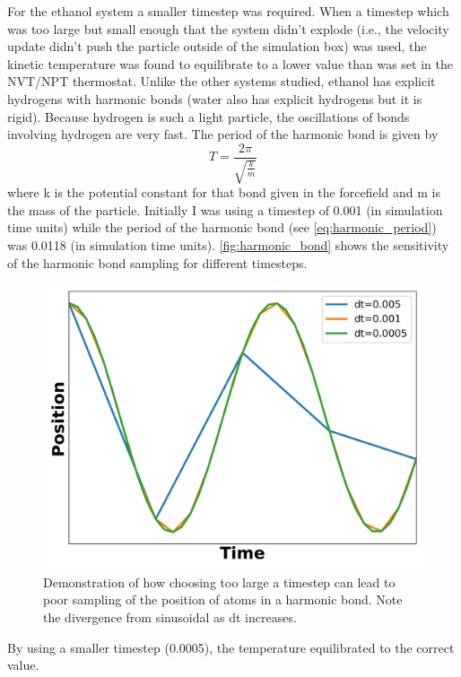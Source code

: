 For the ethanol system a smaller timestep was required.
When a timestep which was too large but small enough that the system didn't explode (i.e., the velocity update didn't push the particle outside of the simulation box) was used, the kinetic temperature was found to equilibrate to a lower value than was set in the NVT/NPT thermostat.
Unlike the other systems studied, ethanol has explicit hydrogens with harmonic bonds (water also has explicit hydrogens but it is rigid). 
Because hydrogen is such a light particle, the oscillations of bonds involving hydrogen are very fast.
The period of the harmonic bond is given by
\begin{equation}\label{eq:harmonic_period}
    T = \frac{2\pi}{\sqrt{\frac{k}{m}}}
\end{equation}
where k is the potential constant for that bond given in the forcefield and m is the mass of the particle.
Initially I was using a timestep of 0.001 (in simulation time units) while the period of the harmonic bond (see \autoref{eq:harmonic_period}) was 0.0118 (in simulation time units). \autoref{fig:harmonic_bond} shows the sensitivity of the harmonic bond sampling for different timesteps.
\begin{figure}[h!]
    \centering
    \includegraphics[width=0.8\linewidth,keepaspectratio]{figures/rep_study/harmonic_bond.png}
    \caption{Demonstration of how choosing too large a timestep can lead to poor sampling of the position of atoms in a harmonic bond. Note the divergence from sinusoidal as dt increases.}\label{fig:harmonic_bond}
\end{figure}
By using a smaller timestep (0.0005), the temperature equilibrated to the correct value.
